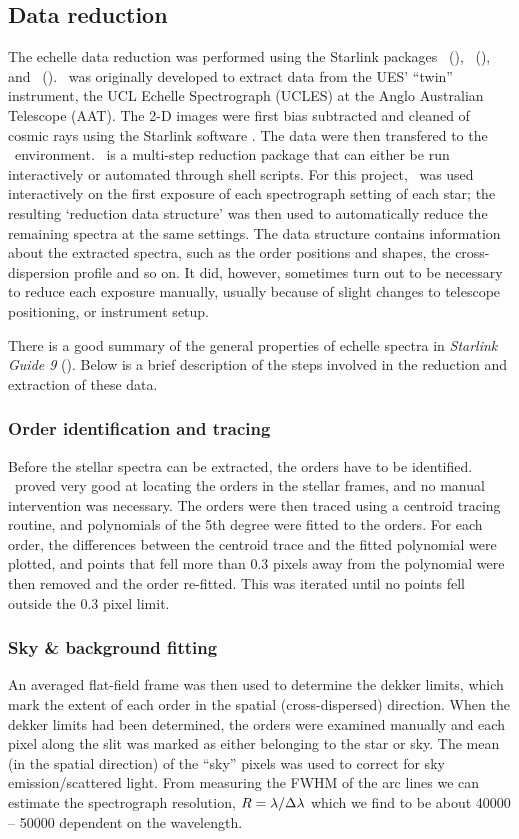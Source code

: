 \subsection{Data reduction}

The echelle data reduction was performed using the Starlink packages
\echomop\ (\cite{sun:152}), \figaro\ (\cite{figaro}), and
\dipso\ (\cite{dipso}). \echomop\ was originally developed to extract data
from the UES' ``twin'' instrument, the UCL Echelle Spectrograph
(UCLES) at the Anglo Australian Telescope (AAT). The 2-D images were
first bias subtracted and cleaned of cosmic rays using the Starlink
software . The data were then transfered to the \echomop\
environment. \echomop\ is a multi-step reduction package that can
either be run interactively or automated through shell scripts. For
this project, \echomop\ was used interactively on the first
exposure of each spectrograph setting of each star; the resulting
`reduction data structure' was then used to automatically reduce the
remaining spectra at the same settings. The data structure contains
information about the extracted spectra, such as the order positions and
shapes, the cross-dispersion profile and so on. It did, however,
sometimes turn out to be necessary to reduce each exposure manually,
usually because of slight changes to telescope positioning, or
instrument setup.

There is a good summary of the general properties of echelle
spectra in \emph{Starlink Guide 9} (\cite{sg:9}). Below is a brief
description of the steps involved in the reduction and extraction of
these data.

\subsubsection{Order identification and tracing}
Before the stellar spectra can be extracted, the orders have to be
identified. \echomop\ proved very good at locating the orders in the
stellar frames, and no manual intervention was necessary. The orders
were then traced using a centroid tracing routine, and polynomials of
the 5th degree were fitted to the orders. For each order, the
differences between the centroid trace and the fitted polynomial were
plotted, and points that fell more than 0.3 pixels away from the
polynomial were then removed and the order re-fitted. This was
iterated until no points fell outside the 0.3 pixel limit.

\subsubsection{Sky \& background fitting}
An averaged flat-field frame was then used to determine the dekker
limits, which mark the extent of each order in the spatial
(cross-dispersed) direction. When the dekker limits had been
determined, the orders were examined manually and each pixel along the
slit was marked as either belonging to the star or sky. The mean (in
the spatial direction) of the ``sky'' pixels was used to correct for
sky emission/scattered light. From measuring the FWHM of the arc lines
we can estimate the spectrograph resolution, $R = \lambda /\Delta\lambda$
which we find to be about 40000 -- 50000 dependent on the wavelength.

